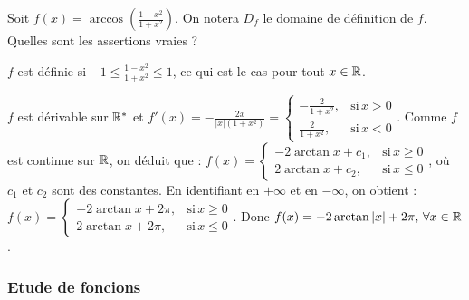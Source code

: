 \begin{question} 
Soit $f(x)= \arccos (\frac{1-x^2}{1+x^2})$. On notera $D_f$ le domaine de définition de $f$. Quelles sont les assertions vraies ?
\begin{answers}



\end{answers}
\begin{explanations}
$f$ est définie si $-1\le \frac{1-x^2}{1+x^2} \le 1 $, ce qui est le cas pour tout $x \in \mathbb{R}$.

$f$ est dérivable sur $\mathbb{R}^*$ et $f'(x) = -\frac{2x}{|x|(1+x^2)} =\left\{\begin{array}{cc}-\frac{2}{1+x^2},& \mbox{si} \, x>0 \\ \frac{2}{1+x^2},& \mbox{si} \, x<0 \end{array}\right. $. Comme $f$ est continue sur $\mathbb{R}$, on déduit que : 
$f(x)= \left\{\begin{array}{cc}-2\arctan x + c_1, & \mbox{si} \, x\ge 0 \\ 2\arctan x + c_2, & \mbox{si} \, x\le 0 \end{array}\right. $, où $c_1$ et $ c_2$  sont des constantes.
En identifiant en $+\infty$ et en $-\infty$, on obtient : 
$f(x)= \left\{\begin{array}{cc}-2\arctan x+2\pi, & \mbox{si} \, x\ge 0 \\ 2\arctan x +2\pi, & \mbox{si} \, x\le 0 \end{array}\right.$.  Donc $f(x)  = -2\arctan |x|+2\pi, \, \forall x \in \mathbb{R}$.

\end{explanations}

\end{question}




\subsubsection{Etude de foncions}


